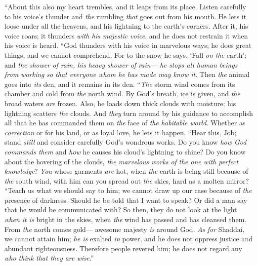 \begin{biblechapter} %
 “About this also my heart trembles, 
and it leaps from its place.
\verse Listen carefully to his voice’s thunder 
and \textit{the} rumbling \textit{that} goes out from his mouth.
\verse He lets it loose under all the heavens, 
and his lightning to the earth’s corners.
\verse After it, his voice roars; 
it thunders \textit{with his majestic voice}, 
and he does not restrain it when his voice is heard.
\verse “God thunders with his voice in marvelous ways; 
he does great things, and we cannot comprehend.
\verse For to the snow he says, ‘Fall \textit{on the} earth’; 
and \textit{the shower of rain, his heavy shower of rain}—
\verse \textit{he stops all human beings from working} 
\textit{so that everyone whom he has made may know it}.
\verse Then \textit{the} animal goes into \textit{its} den, 
and it remains in its den.
\verse “\textit{The} storm wind comes from its chamber 
and cold from \textit{the} north wind.
\verse By God’s breath, ice is given, 
and \textit{the} broad waters \textit{are} frozen.
\verse Also, he loads down thick clouds with moisture; 
his lightning scatters \textit{the} clouds.
\verse And \textit{they} turn around by his guidance 
to accomplish all that he has commanded them 
on \textit{the} face of \textit{the habitable world}.
\verse Whether as \textit{correction} or for his land, 
or as loyal love, he lets it happen.
\verse “Hear this, Job; 
stand \textit{still} and consider carefully God’s wondrous works.
\verse Do you know \textit{how God commands them} 
and \textit{how} he causes his cloud’s lightning to shine?
\verse Do you know about the hovering of the clouds, 
\textit{the marvelous works of the one with perfect knowledge}?
\verse \textit{You} whose garments \textit{are} hot, 
when \textit{the} earth is being still because of \textit{the} south wind,
\verse with him can you spread out \textit{the} skies, 
hard as a molten mirror?
\verse “Teach us what we should say to him; 
we cannot draw up our case because of \textit{the} presence of darkness.
\verse Should he be told that I want to speak? 
Or did a man say that he would be communicated with?
\verse So then, they do not look at the light \textit{when it is} bright in the skies, 
when \textit{the} wind has passed and has cleansed them.
\verse From \textit{the} north comes gold— 
awesome majesty \textit{is} around God.
\verse \textit{As for} Shaddai, we cannot attain him; 
\textit{he is} exalted \textit{in} power, 
and he does not oppress justice and abundant righteousness.
\verse Therefore people revered him; 
he does not regard any \textit{who think that they are wise}.”
\end{biblechapter}

